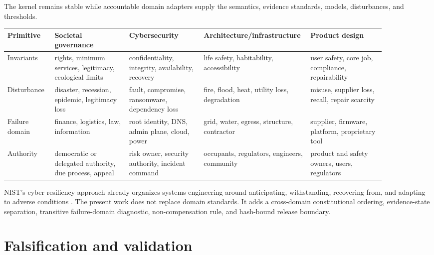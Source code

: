 \documentclass[10pt]{article}
\begin{document}
The kernel remains stable while accountable domain adapters supply the
semantics, evidence standards, models, disturbances, and thresholds.

\begin{center}\scriptsize
\setlength{\tabcolsep}{3pt}
\begin{tabular}{@{}p{0.12\linewidth}p{0.19\linewidth}p{0.19\linewidth}p{0.19\linewidth}p{0.19\linewidth}@{}}
\toprule
Primitive & Societal governance & Cybersecurity & Architecture/infrastructure & Product design \\
\midrule
Invariants & rights, minimum services, legitimacy, ecological limits & confidentiality, integrity, availability, recovery & life safety, habitability, accessibility & user safety, core job, compliance, repairability \\
Disturbance & disaster, recession, epidemic, legitimacy loss & fault, compromise, ransomware, dependency loss & fire, flood, heat, utility loss, degradation & misuse, supplier loss, recall, repair scarcity \\
Failure domain & finance, logistics, law, information & root identity, DNS, admin plane, cloud, power & grid, water, egress, structure, contractor & supplier, firmware, platform, proprietary tool \\
Authority & democratic or delegated authority, due process, appeal & risk owner, security authority, incident command & occupants, regulators, engineers, community & product and safety owners, users, regulators \\
\bottomrule
\end{tabular}
\end{center}

NIST's cyber-resiliency approach already organizes systems engineering around
anticipating, withstanding, recovering from, and adapting to adverse conditions
\cite{nist2021}. The present work does not replace domain standards. It adds a
cross-domain constitutional ordering, evidence-state separation, transitive
failure-domain diagnostic, non-compensation rule, and hash-bound release
boundary.

\section{Falsification and validation}
\end{document}
